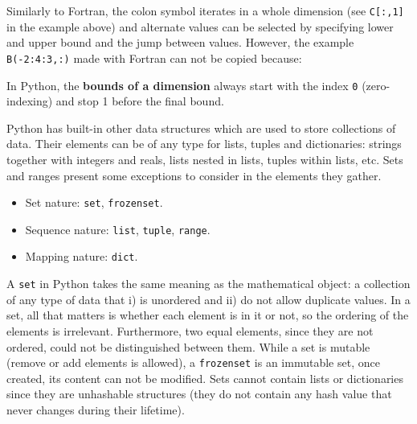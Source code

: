Similarly to Fortran, the colon symbol iterates in a whole dimension (see \texttt{C[:,1]} in the example above) and 
alternate values can be selected by specifying lower and upper bound and the jump between values.
However, the example \texttt{B(-2:4:3,:)} made with Fortran can not be copied because:
\begin{IN}
In Python, the \textbf{bounds of a dimension} always start with the index \texttt{0} (zero-indexing) and
stop 1 before the final bound.  
\end{IN}









\vspace{0.5cm}
Python has built-in other data structures which are used to store collections of data.
Their elements can be of any type for lists, tuples and dictionaries: 
strings together with integers and reals, 
lists nested in lists, tuples within lists, etc. 
Sets and ranges present some exceptions to consider in the elements they gather.
\vspace{-.5cm}
\begin{itemize}[noitemsep]    
    \item Set nature: \texttt{set}, \texttt{frozenset}.
    \item Sequence nature: \texttt{list}, \texttt{tuple}, \texttt{range}.
    \item Mapping nature: \texttt{dict}.
\end{itemize}
\vspace{-.5cm}

A \texttt{set} in Python takes the same meaning as the mathematical object: a collection of any type of data that 
i) is unordered and 
ii) do not allow duplicate values. 
In a set, all that matters is whether each element is in it or not, so the ordering of the elements is irrelevant.
Furthermore, two equal elements, since they are not ordered, could not be distinguished between them. 
While a set is mutable (remove or add elements is allowed), a \texttt{frozenset} is an immutable set, once created, its content can not be modified. 
Sets cannot contain lists or dictionaries since they are unhashable structures (they do not contain any hash value that never changes during their lifetime).


